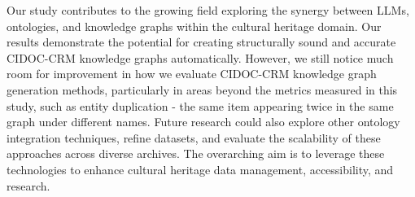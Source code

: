 \documentclass[a4, conference]{IEEEtran}
\begin{document}
Our study contributes to the growing field exploring the synergy between LLMs, ontologies, and knowledge graphs within the cultural heritage domain. Our results demonstrate the potential for creating structurally sound and accurate CIDOC-CRM knowledge graphs automatically. However, we still notice much room for improvement in how we evaluate CIDOC-CRM knowledge graph generation methods, particularly in areas beyond the metrics measured in this study, such as entity duplication - the same item appearing twice in the same graph under different names. Future research could also explore other ontology integration techniques, refine datasets, and evaluate the scalability of these approaches across diverse archives. The overarching aim is to leverage these technologies to enhance cultural heritage data management, accessibility, and research.




\end{document}

